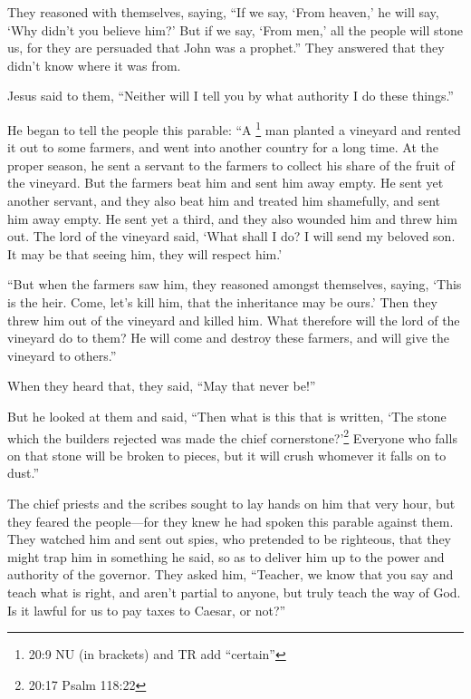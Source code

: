  They reasoned with themselves, saying, ``If we say, `From
heaven,' he will say, `Why didn't you believe him?'  But if
we say, `From men,' all the people will stone us, for they are persuaded
that John was a prophet.''  They answered that they didn't
know where it was from.

 Jesus said to them, ``Neither will I tell you by what
authority I do these things.''

 He began to tell the people this parable: ``A \footnote{20:9
  NU (in brackets) and TR add ``certain''} man planted a vineyard and
rented it out to some farmers, and went into another country for a long
time.  At the proper season, he sent a servant to the
farmers to collect his share of the fruit of the vineyard. But the
farmers beat him and sent him away empty.  He sent yet
another servant, and they also beat him and treated him shamefully, and
sent him away empty.  He sent yet a third, and they also
wounded him and threw him out.  The lord of the vineyard
said, `What shall I do? I will send my beloved son. It may be that
seeing him, they will respect him.'

 ``But when the farmers saw him, they reasoned amongst
themselves, saying, `This is the heir. Come, let's kill him, that the
inheritance may be ours.'  Then they threw him out of the
vineyard and killed him. What therefore will the lord of the vineyard do
to them?  He will come and destroy these farmers, and will
give the vineyard to others.''

When they heard that, they said, ``May that never be!''

 But he looked at them and said, ``Then what is this that
is written, `The stone which the builders rejected was made the chief
cornerstone?'\footnote{20:17 Psalm 118:22}  Everyone who
falls on that stone will be broken to pieces, but it will crush whomever
it falls on to dust.''

 The chief priests and the scribes sought to lay hands on
him that very hour, but they feared the people---for they knew he had
spoken this parable against them.  They watched him and
sent out spies, who pretended to be righteous, that they might trap him
in something he said, so as to deliver him up to the power and authority
of the governor.  They asked him, ``Teacher, we know that
you say and teach what is right, and aren't partial to anyone, but truly
teach the way of God.  Is it lawful for us to pay taxes to
Caesar, or not?''

